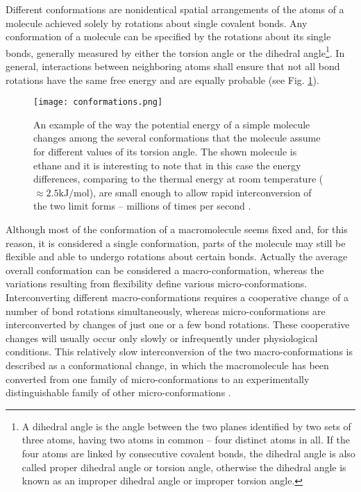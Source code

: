 Different conformations are nonidentical spatial arrangements of the atoms of a molecule achieved solely by rotations about single covalent bonds. %
Any conformation of a molecule %
can be specified by the rotations about its single bonds, generally measured by either the torsion angle or the dihedral angle\footnote{A dihedral angle is the angle between the two planes identified by two sets of three atoms, having two atoms in common -- four distinct atoms in all. If the four atoms are linked by consecutive covalent bonds, the dihedral angle is also called proper dihedral angle or torsion angle, otherwise the dihedral angle is known as an improper dihedral angle or improper torsion angle.}. In general, interactions between neighboring atoms shall ensure that not all bond rotations have the same free energy and are equally probable (see Fig. \ref{fig:EthaneConf}).


\begin{figure}[h]
\centering
\begin{minipage}[t]{0.88\textwidth}
\centering
\texttt{[image: conformations.png]}

\caption{\small{An example of the way the potential energy of a simple molecule changes among the several conformations that the molecule assume for different values of its torsion angle. The shown molecule is ethane and it is interesting to note that in this case the energy differences, comparing to the thermal energy at room temperature ($\approx 2.5 \text{kJ}/\text{mol}$), are small enough to allow rapid interconversion of the two limit forms -- millions of times per second
\cite{nelson2008lehninger}.}}

\label{fig:EthaneConf}
\end{minipage} 
\end{figure}



Although most of the conformation of a macromolecule seems fixed and, for this reason, it is considered a single conformation, parts of the molecule may still be flexible and able to undergo rotations about certain bonds. Actually the average overall conformation can be considered a macro-conformation, whereas the variations resulting from flexibility define various micro-conformations. Interconverting different macro-conformations requires a cooperative change of a number of bond rotations simultaneously, whereas micro-conformations are interconverted by changes of just one or a few bond rotations. These cooperative changes will usually occur only slowly or infrequently under physiological conditions. This relatively slow interconversion of the two macro-conformations is described as a conformational change, in which the macromolecule has been converted from one family of micro-conformations to an experimentally distinguishable family of other micro-conformations
\cite{creighton2010biophysical}.

